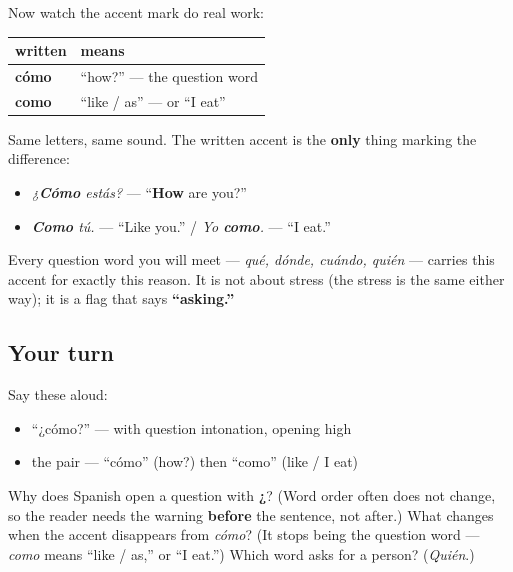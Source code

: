 \begin{grammarlens}[title={Grammar Lens: the accent that marks a question}]
Now watch the accent mark do real work:

\noindent
\begin{tabularx}{\linewidth}{@{}>{\raggedright\arraybackslash}X>{\raggedright\arraybackslash}X@{}}
\toprule
\textbf{written} & \textbf{means} \\
\midrule
\textbf{cómo} & \textquotedblleft{}how?\textquotedblright{} — the question word \\
\textbf{como} & \textquotedblleft{}like / as\textquotedblright{} — or \textquotedblleft{}I eat\textquotedblright{} \\
\bottomrule
\end{tabularx}

Same letters, same sound. The written accent is the \textbf{only} thing marking the difference:

\begin{itemize}
\raggedright
  \item \emph{¿\textbf{Cómo} estás?} — \textquotedblleft{}\textbf{How} are you?\textquotedblright{}
  \item \emph{\textbf{Como} tú.} — \textquotedblleft{}Like you.\textquotedblright{} / \emph{Yo \textbf{como}.} — \textquotedblleft{}I eat.\textquotedblright{}
\end{itemize}

Every question word you will meet — \emph{qué, dónde, cuándo, quién} — carries this accent for exactly this reason. It is not about stress (the stress is the same either way); it is a flag that says \textbf{\textquotedblleft{}asking.\textquotedblright{}}
\end{grammarlens}

\subsection*{Your turn}
Say these aloud:

\begin{itemize}
\raggedright
  \item \textquotedblleft{}¿cómo?\textquotedblright{} — with question intonation, opening high
  \item the pair — \textquotedblleft{}cómo\textquotedblright{} (how?) then \textquotedblleft{}como\textquotedblright{} (like / I eat)
\end{itemize}

\begin{tcolorbox}[breakable,colback=teal!4,colframe=teal!35!black,title={Before you move on}]
Why does Spanish open a question with \textbf{¿}? (Word order often does not change, so the reader needs the warning \textbf{before} the sentence, not after.) What changes when the accent disappears from \emph{cómo}? (It stops being the question word — \emph{como} means \textquotedblleft{}like / as,\textquotedblright{} or \textquotedblleft{}I eat.\textquotedblright{}) Which word asks for a person? (\emph{Quién}.)
\end{tcolorbox}
